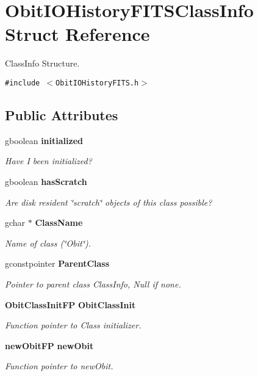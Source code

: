 \section{Obit\-IOHistory\-FITSClass\-Info Struct Reference}
\label{structObitIOHistoryFITSClassInfo}
Class\-Info Structure.  


{\tt \#include $<$Obit\-IOHistory\-FITS.h$>$}

\subsection*{Public Attributes}
\begin{CompactItemize}
\item 
gboolean {\bf initialized}
\begin{CompactList}\small\item\em Have I been initialized? \item\end{CompactList}\item 
gboolean {\bf has\-Scratch}
\begin{CompactList}\small\item\em Are disk resident \char`\"{}scratch\char`\"{} objects of this class possible? \item\end{CompactList}\item 
gchar $\ast$ {\bf Class\-Name}
\begin{CompactList}\small\item\em Name of class (\char`\"{}Obit\char`\"{}). \item\end{CompactList}\item 
gconstpointer {\bf Parent\-Class}
\begin{CompactList}\small\item\em Pointer to parent class Class\-Info, Null if none. \item\end{CompactList}\item 
{\bf Obit\-Class\-Init\-FP} {\bf Obit\-Class\-Init}
\begin{CompactList}\small\item\em Function pointer to Class initializer. \item\end{CompactList}\item 
{\bf new\-Obit\-FP} {\bf new\-Obit}
\begin{CompactList}\small\item\em Function pointer to new\-Obit. \item\end{CompactList}\item 

\end{CompactItemize}
